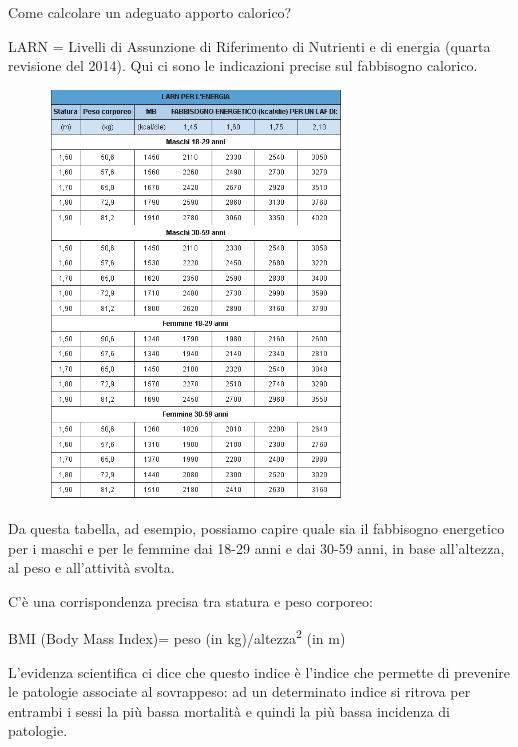 Come calcolare un adeguato apporto calorico?

LARN = Livelli di Assunzione di Riferimento di Nutrienti e di energia
(quarta revisione del 2014). Qui ci sono le indicazioni precise sul
fabbisogno calorico.

\begin{figure}[!ht]
\centering
	\includegraphics[width=0.7\textwidth]{20/image6.png}
	\end{figure}

Da questa tabella, ad esempio, possiamo capire quale sia il fabbisogno
energetico per i maschi e per le femmine dai 18-29 anni e dai 30-59
anni, in base all'altezza, al peso e all'attività svolta.

C'è una corrispondenza precisa tra statura e peso corporeo:

BMI (Body Mass Index)= peso (in kg)/altezza\textsuperscript{2} (in m)

L'evidenza scientifica ci dice che questo indice è l'indice che permette
di prevenire le patologie associate al sovrappeso: ad un determinato
indice si ritrova per entrambi i sessi la più bassa mortalità e quindi
la più bassa incidenza di patologie.

